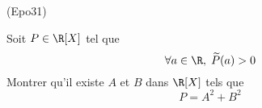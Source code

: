 \begin{tiny}(Epo31)\end{tiny} Soit $P\in \R[X]$ tel que 
\begin{displaymath}
  \forall a\in \R,\; \widetilde{P}(a) > 0
\end{displaymath}
Montrer qu'il existe $A$ et $B$ dans $\R[X]$ tels que 
\begin{displaymath}
  P = A^2 + B^2
\end{displaymath}

